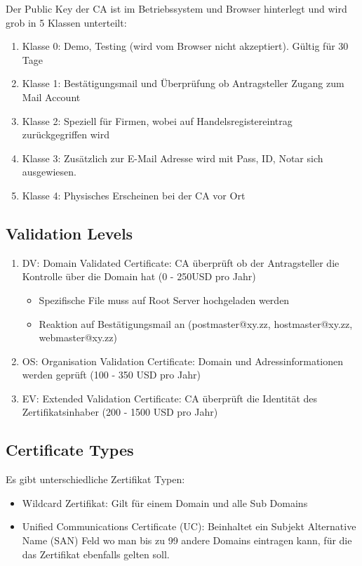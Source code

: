 Der Public Key der CA ist im Betriebssystem und Browser hinterlegt und wird grob in 5 Klassen unterteilt:
\begin{enumerate}
	\item Klasse 0: Demo, Testing (wird vom Browser nicht akzeptiert). Gültig für 30 Tage
	\item Klasse 1: Bestätigungsmail und Überprüfung ob Antragsteller Zugang zum Mail Account
	\item Klasse 2: Speziell für Firmen, wobei auf Handelsregistereintrag zurückgegriffen wird
	\item Klasse 3: Zusätzlich zur E-Mail Adresse wird mit Pass, ID, Notar sich ausgewiesen.
	\item Klasse 4: Physisches Erscheinen bei der CA vor Ort
\end{enumerate}

\subsection{Validation Levels}
\begin{enumerate}
	\item DV: Domain Validated Certificate: CA überprüft ob der Antragsteller die Kontrolle über die Domain hat (0 - 250USD pro Jahr)
	\begin{itemize}
		\item Spezifische File muss auf Root Server hochgeladen werden
		\item Reaktion auf Bestätigungsmail an (postmaster@xy.zz, hostmaster@xy.zz, webmaster@xy.zz) 
	\end{itemize}
	\item OS: Organisation Validation Certificate: Domain und Adressinformationen werden geprüft (100 - 350 USD pro Jahr)
	\item EV: Extended Validation Certificate: CA überprüft die Identität des Zertifikatsinhaber (200 - 1500 USD pro Jahr)
\end{enumerate}

\subsection{Certificate Types}
Es gibt unterschiedliche Zertifikat Typen:
\begin{itemize}
	\item Wildcard Zertifikat: Gilt für einem Domain und alle Sub Domains
	\item Unified Communications Certificate (UC): Beinhaltet ein Subjekt Alternative Name (SAN) Feld wo man bis zu 99 andere Domains eintragen kann, für die das Zertifikat ebenfalls gelten soll.
\end{itemize}

